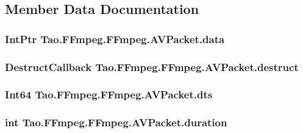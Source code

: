 \subsection{Member Data Documentation}
\hypertarget{struct_tao_1_1_f_fmpeg_1_1_f_fmpeg_1_1_a_v_packet_afbd541634cc2521b03755f07a26504d7}{
\subsubsection[{data}]{\setlength{\rightskip}{0pt plus 5cm}IntPtr {\bf Tao.FFmpeg.FFmpeg.AVPacket.data}}}
\label{struct_tao_1_1_f_fmpeg_1_1_f_fmpeg_1_1_a_v_packet_afbd541634cc2521b03755f07a26504d7}
\hypertarget{struct_tao_1_1_f_fmpeg_1_1_f_fmpeg_1_1_a_v_packet_a8ea7d3e001ba2d58d2f86615df550eee}{
\subsubsection[{destruct}]{\setlength{\rightskip}{0pt plus 5cm}DestructCallback {\bf Tao.FFmpeg.FFmpeg.AVPacket.destruct}}}
\label{struct_tao_1_1_f_fmpeg_1_1_f_fmpeg_1_1_a_v_packet_a8ea7d3e001ba2d58d2f86615df550eee}
\hypertarget{struct_tao_1_1_f_fmpeg_1_1_f_fmpeg_1_1_a_v_packet_a1a953b628b7611ccf1e550a07392c5f4}{
\subsubsection[{dts}]{\setlength{\rightskip}{0pt plus 5cm}Int64 {\bf Tao.FFmpeg.FFmpeg.AVPacket.dts}}}
\label{struct_tao_1_1_f_fmpeg_1_1_f_fmpeg_1_1_a_v_packet_a1a953b628b7611ccf1e550a07392c5f4}
\hypertarget{struct_tao_1_1_f_fmpeg_1_1_f_fmpeg_1_1_a_v_packet_a3f0fdf9289469906f5e243259894847b}{
\subsubsection[{duration}]{\setlength{\rightskip}{0pt plus 5cm}int {\bf Tao.FFmpeg.FFmpeg.AVPacket.duration}}}
